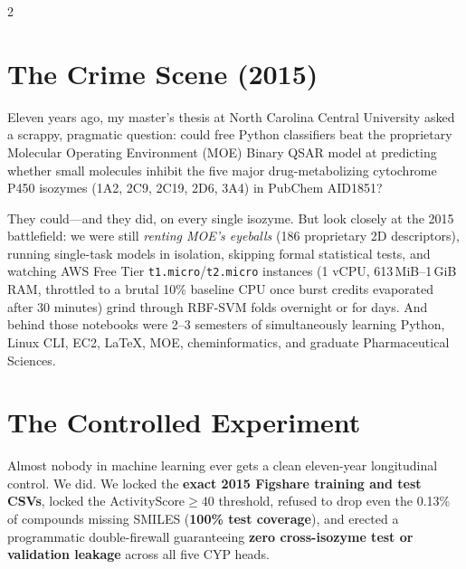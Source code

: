 \documentclass[11pt]{article}
\begin{document}
\begin{multicols}{2}
\section{The Crime Scene (2015)}
Eleven years ago, my master's thesis at North Carolina Central University asked a scrappy, pragmatic question: could free Python classifiers beat the proprietary Molecular Operating Environment (MOE) Binary QSAR model at predicting whether small molecules inhibit the five major drug-metabolizing cytochrome P450 isozymes (1A2, 2C9, 2C19, 2D6, 3A4) in PubChem AID1851?

They could---and they did, on every single isozyme. But look closely at the 2015 battlefield: we were still \emph{renting MOE's eyeballs} (186 proprietary 2D descriptors), running single-task models in isolation, skipping formal statistical tests, and watching AWS Free Tier \texttt{t1.micro}/\texttt{t2.micro} instances (1 vCPU, 613\,MiB--1\,GiB RAM, throttled to a brutal 10\% baseline CPU once burst credits evaporated after 30 minutes) grind through RBF-SVM folds overnight or for days. And behind those notebooks were 2--3 semesters of simultaneously learning Python, Linux CLI, EC2, \LaTeX, MOE, cheminformatics, and graduate Pharmaceutical Sciences.

\section{The Controlled Experiment}
Almost nobody in machine learning ever gets a clean eleven-year longitudinal control. We did. We locked the \textbf{exact 2015 Figshare training and test CSVs}, locked the $\text{ActivityScore} \ge 40$ threshold, refused to drop even the 0.13\% of compounds missing SMILES (\textbf{100\% test coverage}), and erected a programmatic double-firewall guaranteeing \textbf{zero cross-isozyme test or validation leakage} across all five CYP heads.


\end{multicols}
\end{document}
